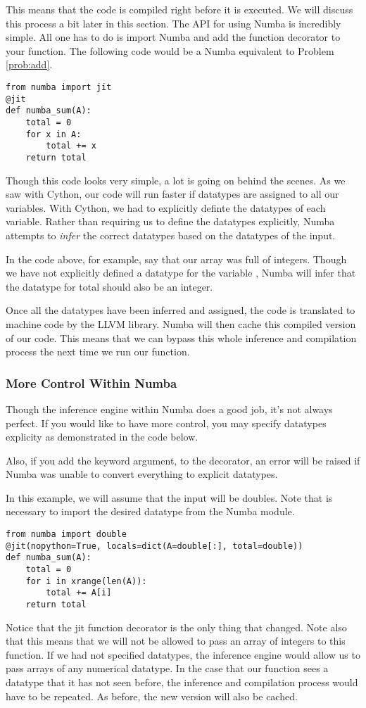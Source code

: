 This means that the code is compiled right before it is executed. We will discuss this process a bit later in this section.
The API for using Numba is incredibly simple. All one has to do is import Numba and add the  function decorator to your function. The following code would be a Numba equivalent to Problem \ref{prob:add}.
\begin{lstlisting}
from numba import jit
@jit
def numba_sum(A):
    total = 0
    for x in A:
        total += x
    return total
\end{lstlisting}

Though this code looks very simple, a lot is going on behind the scenes. As we saw with Cython, our code will run faster if datatypes are assigned to all our variables. With Cython, we had to explicitly definte the datatypes of each variable. Rather than requiring us to define the datatypes explicitly, Numba attempts to \emph{infer} the correct datatypes based on the datatypes of the input.

In the code above, for example, say that our array  was full of integers. Though we have not explicitly defined a datatype for the variable , Numba will infer that the datatype for total should also be an integer.

Once all the datatypes have been inferred and assigned, the code is translated to machine code by the LLVM library. Numba will then cache this compiled version of our code. This means that we can bypass this whole inference and compilation process the next time we run our function.

\subsubsection*{More Control Within Numba}
Though the inference engine within Numba does a good job, it's not always perfect. If you would like to have more control, you may specify datatypes explicity as demonstrated in the code below.

Also, if you add the keyword argument,  to the  decorator, an error will be raised if Numba was unable to convert everything to explicit datatypes.

In this example, we will assume that the input will be doubles. Note that is necessary to import the desired datatype from the Numba module.

\begin{lstlisting}
from numba import double
@jit(nopython=True, locals=dict(A=double[:], total=double))
def numba_sum(A):
    total = 0
    for i in xrange(len(A)):
        total += A[i]
    return total
\end{lstlisting}
Notice that the jit function decorator is the only thing that changed. Note also that this means that we will not be allowed to pass an array of integers to this function. If we had not specified datatypes, the inference engine would allow us to pass arrays of any numerical datatype. In the case that our function sees a datatype that it has not seen before, the inference and compilation process would have to be repeated. As before, the new version will also be cached.


